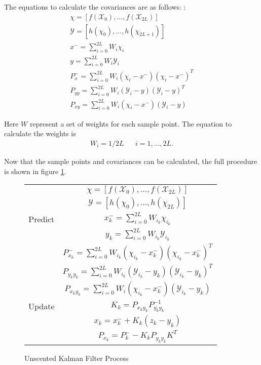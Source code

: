 The equations to calculate the covariances are as follows: \cite{ukf_merwe}:
\begin{align} \label{covariance calcs}
\chi = [f(\mathcal{X}_0),...,f(\mathcal{X}_{2L})]\\
\mathcal{Y} = [h(\chi_0),...,h(\chi_{2L+1})]\\
x^- = \sum_{i=0}^{2L}W_i\chi_i\\
y = \sum_{i=0}^{2L}W_i\mathcal{Y}_i\\
P^-_x = \sum_{i=0}^{2L}W_i(\chi_i - x^-)(\chi_i - x^-)^T\\
P_{yy} = \sum_{i=0}^{2L}W_i(\mathcal{Y}_i - y)(\mathcal{Y}_i - y)^T \\
P_{xy} = \sum_{i=0}^{2L}W_i(\chi_i - x^-)(\mathcal{Y}_i - y)
\end{align}

Here $W$ represent a set of weights for each sample point. The equation to calculate the weights is \cite{Julier_sigma}
\begin{align}
W_i = 1/2L && i = 1,...,2L.
\end{align}

Now that the sample points and covariances can be calculated, the full procedure is shown in figure \ref{UKF Process}.

\begin{figure}[ht!]
\begin{center}
	\begin{tabular}{| c | c|} 
		\hline
		\space & $\chi = [f(\mathcal{X}_0),...,f(\mathcal{X}_{2L})]$\\
		\space & $\mathcal{Y} = [h(\chi_0),...,h(\chi_{2L})]$\\
		Predict & $x^-_k = \sum_{i=0}^{2L}W_{i_k}\chi_{i_k}$\\
		\space & $y_k = \sum_{i=0}^{2L}W_{i_k}\mathcal{Y}_{i_k}$\\
		\space & $P^-_{x_k} = \sum_{i=0}^{2L}W_{i_k}(\chi_{i_k} - x^-_k)(\chi_{i_k} - x^-_k)^T$\\ 
		\hline
		\space & $P_{y_ky_k} = \sum_{i=0}^{2L}W_{i_k}(\mathcal{Y}_{i_k} - y_k)(\mathcal{Y}_{i_k} - y_k)^T$ \\
		\space & $P_{x_ky_k} = \sum_{i=0}^{2L}W_i(\chi_{i_k} - x^-_k)(\mathcal{Y}_{i_k} - y_k)$\\
		Update & $K_{k} = P_{x_ky_k}P^{-1}_{y_ky_k}$ \\
		\space & $x_{k} = x^-_{k} + K_k(z_k - y_k)$ \\
		\space & $P_{x_k} = P^-_k - K_kP_{y_ky_k}K^T$\\
		\hline
	\end{tabular}
\end{center}
\caption{Unscented Kalman Filter Process}
\label{UKF Process}
\end{figure}

